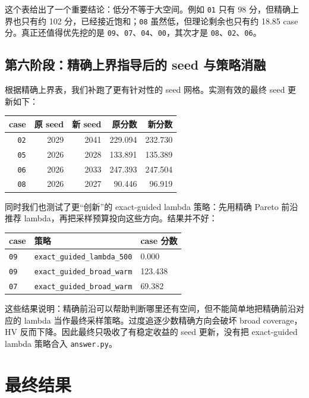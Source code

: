 \documentclass[UTF8,zihao=-4]{ctexart}
\newcommand{\code}[1]{\texttt{#1}}
\begin{document}
这个表给出了一个重要结论：低分不等于大空间。例如 \code{01} 只有 98 分，但精确上界也只有约 102 分，已经接近饱和；\code{08} 虽然低，但理论剩余也只有约 18.85 case 分。真正还值得优先挖的是 \code{09}、\code{07}、\code{04}、\code{00}，其次才是 \code{08}、\code{02}、\code{06}。

\subsection{第六阶段：精确上界指导后的 seed 与策略消融}

根据精确上界表，我们补跑了更有针对性的 seed 网格。实测有效的最终 seed 更新如下：

\begin{center}
\begin{tabular}{rrrrr}
\toprule
case & 原 seed & 新 seed & 原分数 & 新分数 \\
\midrule
\code{02} & 2029 & 2041 & 229.094 & 232.730 \\
\code{05} & 2026 & 2028 & 133.891 & 135.389 \\
\code{06} & 2026 & 2033 & 247.393 & 247.504 \\
\code{08} & 2026 & 2027 & 90.446 & 96.919 \\
\bottomrule
\end{tabular}
\end{center}

同时我们也测试了更“创新”的 exact-guided lambda 策略：先用精确 Pareto 前沿推荐 lambda，再把采样预算投向这些方向。结果并不好：

\begin{center}
\begin{tabular}{lll}
\toprule
case & 策略 & case 分数 \\
\midrule
\code{09} & \code{exact\_guided\_lambda\_500} & 0.000 \\
\code{09} & \code{exact\_guided\_broad\_warm} & 123.438 \\
\code{07} & \code{exact\_guided\_broad\_warm} & 69.382 \\
\bottomrule
\end{tabular}
\end{center}

这些结果说明：精确前沿可以帮助判断哪里还有空间，但不能简单地把精确前沿对应的 lambda 当作最终采样策略。过度追逐少数精确方向会破坏 broad coverage，HV 反而下降。因此最终只吸收了有稳定收益的 seed 更新，没有把 exact-guided lambda 策略合入 \code{answer.py}。

\section{最终结果}
\end{document}
